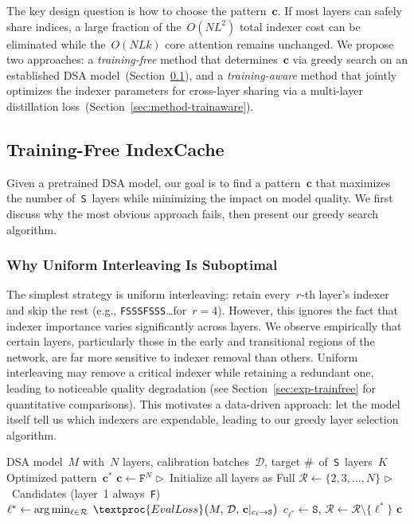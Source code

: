The key design question is how to choose the pattern~$\mathbf{c}$.
If most layers can safely share indices, a large fraction of the~$O(NL^2)$ total indexer cost can be eliminated while the~$O(NLk)$ core attention remains unchanged.
We propose two approaches: a \emph{training-free} method that determines~$\mathbf{c}$ via greedy search on an established DSA model~(Section~\ref{sec:method-trainfree}), and a \emph{training-aware} method that jointly optimizes the indexer parameters for cross-layer sharing via a multi-layer distillation loss~(Section~\ref{sec:method-trainaware}).

\subsection{Training-Free IndexCache}
\label{sec:method-trainfree}

Given a pretrained DSA model, our goal is to find a pattern~$\mathbf{c}$ that maximizes the number of~\texttt{S}~layers while minimizing the impact on model quality.
We first discuss why the most obvious approach fails, then present our greedy search algorithm.

\subsubsection{Why Uniform Interleaving Is Suboptimal}
\label{sec:method-interleave}

The simplest strategy is uniform interleaving: retain every~$r$-th layer's indexer and skip the rest (e.g., \texttt{FSSSFSSS}\dots for~$r{=}4$).
However, this ignores the fact that indexer importance varies significantly across layers.
We observe empirically that certain layers, particularly those in the early and transitional regions of the network, are far more sensitive to indexer removal than others.
Uniform interleaving may remove a critical indexer while retaining a redundant one, leading to noticeable quality degradation (see Section~\ref{sec:exp-trainfree} for quantitative comparisons).
This motivates a data-driven approach: let the model itself tell us which indexers are expendable, leading to our greedy layer selection algorithm.

\begin{algorithm}[t]
\caption{Greedy Layer Selection for Training-Free IndexCache}
\label{alg:greedy}
\begin{algorithmic}[1]
\REQUIRE DSA model~$M$ with~$N$ layers, calibration batches~$\mathcal{D}$, target \#~of~\texttt{S}~layers~$K$
\ENSURE Optimized pattern~$\mathbf{c}^*$
\STATE $\mathbf{c} \leftarrow \texttt{F}^N$ \hfill $\triangleright$~Initialize all layers as Full
\STATE $\mathcal{R} \leftarrow \{2, 3, \ldots, N\}$ \hfill $\triangleright$~Candidates (layer~1 always~\texttt{F})
    \STATE $\ell^* \leftarrow \arg\min_{\ell \in \mathcal{R}} \;\textproc{EvalLoss}\bigl(M,\, \mathcal{D},\, \mathbf{c}|_{c_\ell \to \texttt{S}}\bigr)$
    \STATE $c_{\ell^*} \leftarrow \texttt{S}$,\; $\mathcal{R} \leftarrow \mathcal{R} \setminus \{\ell^*\}$
\ENDFOR
\RETURN $\mathbf{c}$
\end{algorithmic}
\end{algorithm}

